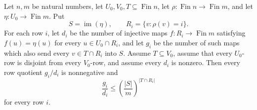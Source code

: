 \begin{helper}
Let \(n,m\) be natural numbers, let \(U_0,V_0,T\subseteq \operatorname{Fin} n\),
let \(\rho:\operatorname{Fin}n\to \operatorname{Fin}m\), and let
\(\eta:U_0\to \operatorname{Fin}m\).  Put
\[
S=\operatorname{im}(\eta),\qquad
R_i=\{v:\rho(v)=i\}.
\]
For each row \(i\), let \(d_i\) be the number of injective maps
\(f:R_i\to\operatorname{Fin}m\) satisfying \(f(u)=\eta(u)\) for every
\(u\in U_0\cap R_i\), and let \(g_i\) be the number of such maps which also
send every \(v\in T\cap R_i\) into \(S\).  Assume \(T\subseteq V_0\), assume
that every \(U_0\)-row is disjoint from every \(V_0\)-row, and assume every
\(d_i\) is nonzero.  Then every row quotient \(g_i/d_i\) is nonnegative and
\[
\frac{g_i}{d_i}\le
\left(\frac{|S|}{m}\right)^{|T\cap R_i|}
\]
for every row \(i\).
\end{helper}
